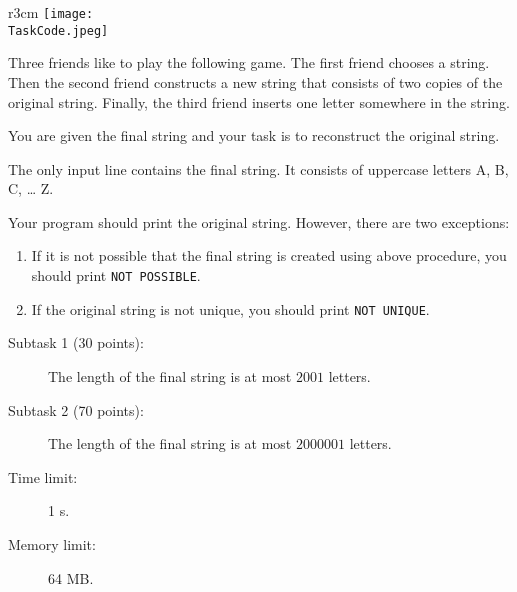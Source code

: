 \documentclass{boi2014}
\renewcommand{\TaskCode}{friends}
\begin{document}
    \begin{wrapfigure}{r}{3cm}
		\texttt{[image: \\TaskCode.jpeg]}
	\end{wrapfigure}
    Three friends like to play the following game.
    The first friend chooses a string.
    Then the second friend constructs a new string that consists of
    two copies of the original string. 
    Finally, the third friend inserts one letter somewhere in the string.

    \Task
    You are given the final string and your task is to reconstruct the original
    string.

    \Input
    The only input line contains the final string. It consists of
    uppercase letters A, B, C, \ldots{} Z.

    \Output
    Your program should print the original string.
    However, there are two exceptions:
    \begin{enumerate}
        \item If it is not possible that the final string is created using above
        procedure, you should print {\tt NOT POSSIBLE}.
        \item If the original string is not unique, you should print {\tt NOT
        UNIQUE}.
    \end{enumerate}
    

    \Examples


    \Scoring

    \begin{description}
        \item[Subtask 1 (30 points):] The length of the final string is at
        most $2001$ letters.
        \item[Subtask 2 (70 points):] The length of the final string is at
        most $2000001$ letters.
    \end{description}

    \Constraints

    \begin{description}
        \item[Time limit:] 1 s.
        \item[Memory limit:] 64 MB.
    \end{description}
\end{document}

